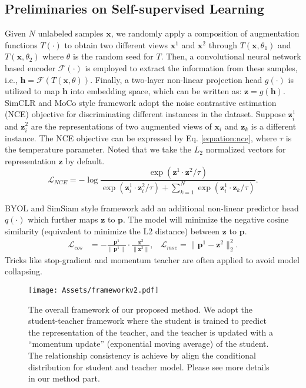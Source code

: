 \documentclass{article}
\newcommand{\<}{\left\langle}
\renewcommand{\>}{\right\rangle}
\begin{document}
\subsection{Preliminaries on Self-supervised Learning}
Given $N$ unlabeled samples $\mathbf{x}$, we randomly apply a composition of augmentation functions $T(\cdot)$ to obtain two different views $\mathbf{x}^{1}$ and $\mathbf{x}^{2}$ through $T(\mathbf{x}, \theta_{1})$ and $T(\mathbf{x}, \theta_{2})$ where $\theta$ is the random seed for $T$. Then, a convolutional neural network based encoder $\mathcal{F}(\cdot)$ is employed to extract the information from these samples, i.e.,   $\mathbf{h} = \mathcal{F}(T(\mathbf{x}, \theta))$. Finally, a two-layer non-linear projection head $g(\cdot)$ is utilized to map $\mathbf{h}$ into embedding space, which can be written as: $\mathbf{z} = g(\mathbf{h})$. SimCLR \cite{simclr} and MoCo \cite{moco} style framework adopt the noise contrastive estimation (NCE) objective for discriminating different instances in the dataset. Suppose $\mathbf{z}^{1}_{i}$ and $\mathbf{z}^{2}_{i}$ are the representations of two augmented views of $\mathbf{x}_{i}$ and $\mathbf{z}_{k}$ is a different instance. The NCE objective can be expressed by Eq. \eqref{equation:nce}, where $\tau$ is the temperature parameter. Noted that we take the $L_2$ normalized vectors for representation $\mathbf{z}$ by default. 
\begin{equation}
    \label{equation:nce}
    \mathcal{L}_{NCE} = -\log \frac{\exp(\mathbf{z}^{1} \cdot \mathbf{z}^{2}/ \tau) }{ \exp(\mathbf{z}_{i}^{1} \cdot \mathbf{z}_{i}^{2} / \tau ) + \sum_{k=1}^{N}  \exp(\mathbf{z}_{i}^{1} \cdot \mathbf{z}_{k} / \tau ) }.
\end{equation}

BYOL \cite{byol} and SimSiam \cite{SimSiam} style framework add an additional non-linear predictor head $q(\cdot)$ which further maps $\mathbf{z}$ to $\mathbf{p}$. The model will minimize the negative cosine similarity (equivalent to minimize the L2 distance) between $\mathbf{z}$ to $\mathbf{p}$.
\begin{align}
    \label{equation:byol}
    \mathcal{L}_{cos} &= - \frac{\mathbf{p}^1}{\lVert \mathbf{p}^1 \lVert} \cdot \frac{\mathbf{z}^2}{\lVert \mathbf{z}^2 \lVert}, & \mathcal{L}_{mse} = \lVert  \mathbf{p}^1 - \mathbf{z}^2\lVert^2_2.
\end{align}
Tricks like stop-gradient and momentum teacher are often applied to avoid model collapsing.

\begin{figure*}
    \centering
    \texttt{[image: Assets/frameworkv2.pdf]}
    \vspace{-10pt}
    \caption{The overall framework of our proposed method. We adopt the student-teacher framework where the student is trained to predict the representation of the teacher, and the teacher is updated with a “momentum update” (exponential moving average) of the student. The relationship consistency is achieve by align the conditional distribution for student and teacher model. Please see more details in our method part.}
    \label{fig:framework}
    \vspace{-10pt}
\end{figure*}
\end{document}
